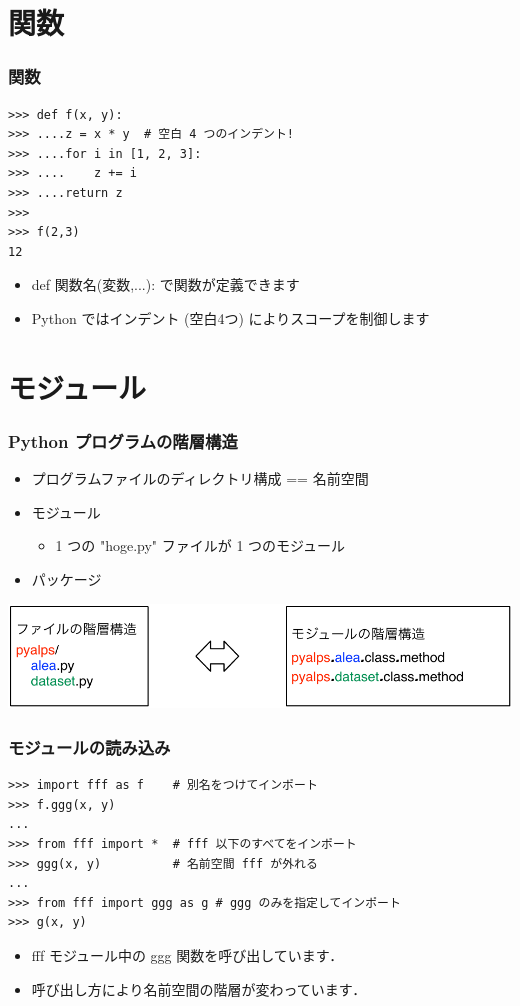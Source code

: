\section{関数}
\begin{frame}[t,fragile]
\frametitle{関数}
\begin{lstlisting}
>>> def f(x, y):
>>> ....z = x * y  # 空白 4 つのインデント!
>>> ....for i in [1, 2, 3]:
>>> ....    z += i
>>> ....return z
>>>
>>> f(2,3)
12
\end{lstlisting}
\begin{itemize}
\item def 関数名(変数,...): で関数が定義できます
\item Python ではインデント (空白4つ) によりスコープを制御します
\end{itemize}
\end{frame}

\section{モジュール}
\begin{frame}[t]
\frametitle{Python プログラムの階層構造}
\begin{itemize}
\item プログラムファイルのディレクトリ構成 == 名前空間
\item モジュール
\begin{itemize}
 \item 1 つの "hoge.py" ファイルが 1 つのモジュール
\end{itemize}
\item パッケージ
\end{itemize}
\includegraphics[width=\textwidth]{module.pdf}
\end{frame}

\begin{frame}[t,fragile]
\frametitle{モジュールの読み込み}
\begin{lstlisting}
>>> import fff as f    # 別名をつけてインポート
>>> f.ggg(x, y)
...
>>> from fff import *  # fff 以下のすべてをインポート
>>> ggg(x, y)          # 名前空間 fff が外れる
...
>>> from fff import ggg as g # ggg のみを指定してインポート
>>> g(x, y)
\end{lstlisting}
\begin{itemize}
\item fff モジュール中の ggg 関数を呼び出しています．
\item 呼び出し方により名前空間の階層が変わっています．
\end{itemize}

\end{frame}

